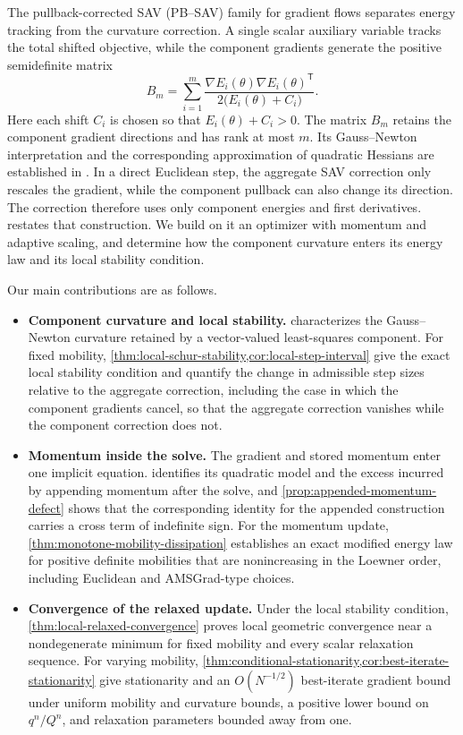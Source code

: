 The pullback-corrected SAV (PB--SAV) family for gradient flows
\cite{zhang2026pbsav} separates energy tracking from the curvature
correction. A single scalar auxiliary variable tracks the total
shifted objective, while the component gradients generate the positive
semidefinite matrix
\[
B_m
=
\sum_{i=1}^{m}
\frac{\nabla E_i(\theta)\nabla E_i(\theta)^{\mathsf T}}
{2\bigl(E_i(\theta)+C_i\bigr)}.
\]
Here each shift \(C_i\) is chosen so that \(E_i(\theta)+C_i>0\). The matrix
\(B_m\) retains the component gradient directions and has rank at most \(m\).
Its Gauss--Newton interpretation and the corresponding approximation of
quadratic Hessians are established in \cite{zhang2026pbsav}. In a direct
Euclidean step, the aggregate SAV correction only rescales the gradient, while the component pullback can also change its direction. The correction therefore uses only component energies and
first derivatives.
 restates that construction. We build on it an
optimizer with momentum and adaptive scaling, and determine how the component
curvature enters its energy law and its local stability condition.

Our main contributions are as follows.
\begin{itemize}[leftmargin=*]

\item \textbf{Component curvature and local stability.}
 characterizes the Gauss--Newton curvature
retained by a vector-valued least-squares component. For fixed mobility,
\cref{thm:local-schur-stability,cor:local-step-interval} give the exact local
stability condition and quantify the change in admissible step sizes relative
to the aggregate correction, including the
case in which the component gradients cancel, so that the aggregate correction
vanishes while the component correction does not.

\item \textbf{Momentum inside the solve.}
The gradient and stored momentum enter one implicit equation.
 identifies its quadratic model and the excess
incurred by appending momentum after the solve, and
\cref{prop:appended-momentum-defect} shows that the corresponding identity
for the appended construction carries a cross term of indefinite sign. For the momentum update,
\cref{thm:monotone-mobility-dissipation} establishes an exact modified energy
law for positive definite mobilities that are nonincreasing in the Loewner
order, including Euclidean and AMSGrad-type choices.

\item \textbf{Convergence of the relaxed update.}
Under the local stability condition,
\cref{thm:local-relaxed-convergence} proves local geometric convergence near a
nondegenerate minimum for fixed mobility and every scalar relaxation
sequence. For varying mobility,
\cref{thm:conditional-stationarity,cor:best-iterate-stationarity} give
stationarity and an \(O(N^{-1/2})\) best-iterate gradient bound under uniform
mobility and curvature bounds, a positive lower bound on \(q^n/Q^n\), and
relaxation parameters bounded away from one.

\end{itemize}

